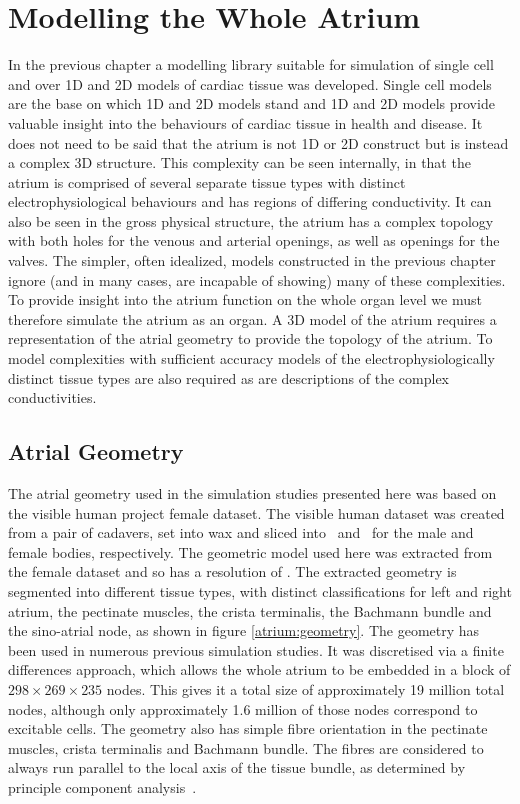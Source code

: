 \chapter{Modelling the Whole Atrium}

In the previous chapter a modelling library suitable for simulation of single
cell and over 1D and 2D models of cardiac tissue was developed.
Single cell models are the base on which 1D and 2D models stand and 1D and 2D
models provide valuable insight into the behaviours of cardiac tissue in health
and disease.
It does not need to be said that the atrium is not 1D or 2D construct but is
instead a complex 3D structure.
This complexity can be seen internally, in that the atrium is comprised of several
separate tissue types with distinct electrophysiological behaviours and has
regions of differing conductivity.
It can also be seen in the gross physical structure, the atrium has a complex
topology with both holes for the venous and arterial openings, as well as
openings for the valves.
The simpler, often idealized, models constructed in the previous chapter
ignore (and in many cases, are incapable of showing) many of these complexities.
To provide insight into the atrium function on the whole organ level we must
therefore simulate the atrium as an organ.
A 3D model of the atrium requires a representation of the atrial geometry to
provide the topology of the atrium.
To model complexities with sufficient accuracy models of the
electrophysiologically distinct tissue types are also required as are
descriptions of the complex conductivities.


\section{Atrial Geometry}
\label{atrium:sec:geometry}

The atrial geometry used in the simulation studies presented here was based on
the visible human project female dataset.  The visible human dataset was
created from a pair of cadavers, set into wax and sliced into \ and
\ for the male and female bodies, respectively.  The geometric model
used here was extracted from the female dataset and so has a resolution of
.  The extracted geometry is segmented into different tissue types,
with distinct classifications for left and right atrium, the pectinate muscles,
the crista terminalis, the Bachmann bundle and the sino-atrial node, as shown in
figure \ref{atrium:geometry}.  The geometry has been used in numerous previous
simulation studies.  It was discretised via a finite differences approach, which
allows the whole atrium to be embedded in a block of $298\times269\times235$
nodes.  This gives it a total size of approximately 19 million total nodes,
although only approximately 1.6 million of those nodes correspond to excitable
cells.  The geometry also has simple fibre orientation in the pectinate muscles,
crista terminalis and Bachmann bundle.  The fibres are considered to always run
parallel to the local axis of the tissue bundle, as determined by principle
component analysis~\cite{Seemann2006}.

